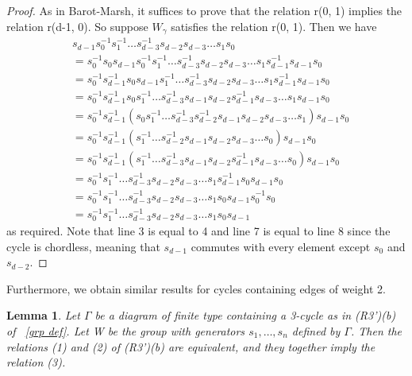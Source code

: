 \documentclass[11pt]{amsart}
\newtheorem{lem}[thm]{Lemma}
\theoremstyle{definition}
\begin{document}
\begin{proof}
As in Barot-Marsh, it suffices to prove that the relation r(0, 1) implies the relation r(d-1, 0). So suppose $W_{\gamma}$ satisfies the relation r(0, 1). Then we have 
\begin{align*}
& s_{d-1}s_{0}^{-1}s_{1}^{-1}\dots s_{d-3}^{-1}s_{d-2}s_{d-3}\dots s_1s_0 \\
&= s_{0}^{-1}s_{0}s_{d-1}s_{0}^{-1}s_{1}^{-1}\dots s_{d-3}^{-1}s_{d-2}s_{d-3}\dots s_{1}s_{d-1}^{-1}s_{d-1}s_{0} \\
&= s_{0}^{-1}s_{d-1}^{-1}s_{0}s_{d-1}s_{1}^{-1}\dots s_{d-3}^{-1}s_{d-2}s_{d-3}\dots s_{1}s_{d-1}^{-1}s_{d-1}s_{0} \\
&= s_{0}^{-1}s_{d-1}^{-1}s_{0}s_{1}^{-1}\dots s_{d-3}^{-1}s_{d-1}s_{d-2}s_{d-1}^{-1}s_{d-3}\dots s_{1}s_{d-1}s_{0} \\
&= s_{0}^{-1}s_{d-1}^{-1}(s_{0}s_{1}^{-1}\dots s_{d-3}^{-1}s_{d-2}^{-1}s_{d-1}s_{d-2}s_{d-3}\dots s_{1})s_{d-1}s_{0} \\
&= s_{0}^{-1}s_{d-1}^{-1}(s_{1}^{-1} \dots s_{d-2}^{-1}s_{d-1}s_{d-2}s_{d-3}\dots s_{0})s_{d-1}s_{0} \\
&= s_{0}^{-1}s_{d-1}^{-1}(s_{1}^{-1} \dots s_{d-3}^{-1}s_{d-1}s_{d-2}s_{d-1}^{-1}s_{d-3}\dots s_{0})s_{d-1}s_{0} \\
&= s_{0}^{-1}s_{1}^{-1}\dots s_{d-3}^{-1}s_{d-2}s_{d-3}\dots s_{1}s_{d-1}^{-1}s_{0}s_{d-1}s_{0} \\
&= s_{0}^{-1}s_{1}^{-1}\dots s_{d-3}^{-1}s_{d-2}s_{d-3}\dots s_{1}s_{0}s_{d-1}s_{0}^{-1}s_{0} \\
&= s_{0}^{-1}s_{1}^{-1}\dots s_{d-3}^{-1}s_{d-2}s_{d-3}\dots s_{1}s_{0}s_{d-1} 
\end{align*}
as required. Note that line 3 is equal to 4 and line 7 is equal to line 8 since the cycle is chordless, meaning that $s_{d-1}$ commutes with every element except $s_{0}$ and $s_{d-2}$.
\end{proof}

Furthermore, we obtain similar results for cycles containing edges of weight 2.

\begin{lem} 
Let $\Gamma$ be a diagram of finite type containing a 3-cycle as in (R3')(b) of ~\ref{grp def}. Let W be the group with generators $s_{1}, \dots, s_{n}$ defined by $\Gamma$. Then the relations (1) and (2) of (R3')(b) are equivalent, and they together imply the relation (3).
\end{lem}
\end{document}
